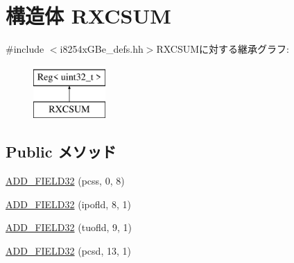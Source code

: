 \hypertarget{structiGbReg_1_1Regs_1_1RXCSUM}{
\section{構造体 RXCSUM}
\label{structiGbReg_1_1Regs_1_1RXCSUM}
}


{\ttfamily \#include $<$i8254xGBe\_\-defs.hh$>$}RXCSUMに対する継承グラフ:\begin{figure}[H]
\begin{center}
\leavevmode
\includegraphics[height=2cm]{structiGbReg_1_1Regs_1_1RXCSUM}
\end{center}
\end{figure}
\subsection*{Public メソッド}
\begin{DoxyCompactItemize}
\item 
\hyperlink{structiGbReg_1_1Regs_1_1RXCSUM_ae92cbd75d7bd66217620641bbe7ff662}{ADD\_\-FIELD32} (pcss, 0, 8)
\item 
\hyperlink{structiGbReg_1_1Regs_1_1RXCSUM_ab1bf26ef899ed95d4ad59ecef141170c}{ADD\_\-FIELD32} (ipofld, 8, 1)
\item 
\hyperlink{structiGbReg_1_1Regs_1_1RXCSUM_a1d3cb3b422ae90b17bf4db1057db7723}{ADD\_\-FIELD32} (tuofld, 9, 1)
\item 
\hyperlink{structiGbReg_1_1Regs_1_1RXCSUM_ad10520b43b14570d664a2de95b5dc761}{ADD\_\-FIELD32} (pcsd, 13, 1)
\end{DoxyCompactItemize}


